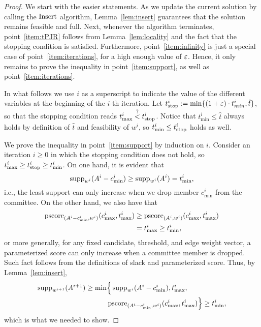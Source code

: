 \begin{proof}
We start with the easier statements. 
As we update the current solution by calling the $\operatorname{Insert}$ algorithm, Lemma~\ref{lem:insert} guarantees that the solution remains feasible and full. 
Next, whenever the algorithm terminates, point~\ref{item:tPJR} follows from Lemma~\ref{lem:locality} and the fact that the stopping condition is satisfied. 
Furthermore, point~\ref{item:infinity} is just a special case of point~\ref{item:iterations}, for a high enough value of $\varepsilon$. 
Hence, it only remains to prove the inequality in point~\ref{item:support}, as well as point~\ref{item:iterations}. 

In what follows we use $i$ as a superscript to indicate the value of the different variables at the beginning of the $i$-th iteration. 
 Let $t^i_{\operatorname*{stop}}:=\min\{(1+\varepsilon)\cdot t^i_{min}, \hat{t}\}$, so that the stopping condition reads $t^i_{\max} \stackrel{?}{<} t^i_{\operatorname*{stop}}$. 
Notice that $t^i_{\min}\leq \hat{t}$ always holds by definition of $\hat{t}$ and feasibility of $w^i$, so $t^i_{\min}\leq t^i_{\operatorname*{stop}}$ holds as well. 
 
We prove the inequality in point~\ref{item:support} by induction on $i$. 
Consider an iteration $i\geq 0$ in which the stopping condition does not hold, so $t^i_{\max} \geq t^i_{\operatorname*{stop}}\geq t^i_{\min}$. 
On one hand, it is evident that 
$$\operatorname{supp}_{w^i}(A^i-c^i_{\min})\geq \operatorname{supp}_{w^i}(A^i)=t^i_{\min}, $$ 
%
i.e., the least support can only increase when we drop member $c_{\min}^i$ from the committee. 
On the other hand, we also have that  
\begin{align*}
\operatorname{pscore}_{(A^i-c_{\min}^i, w^i)}(c^i_{\max}, t^i_{\max}) &\geq \operatorname{pscore}_{(A^i, w^i)}(c^i_{\max}, t^i_{\max}) \\
	& = t^i_{\max}\geq t^i_{\min},
\end{align*}
%
or more generally, for any fixed candidate, threshold, and edge weight vector, a parameterized score can only increase when a committee member is dropped. Such fact follows from the definitions of slack and parameterized score. 
Thus, by Lemma~\ref{lem:insert}, 
\begin{align*}
\operatorname{supp}_{w^{i+1}} (A^{i+1}) \geq \min & \Big\{ \operatorname{supp}_{w^i}(A^i-c^i_{\min}), t^i_{\max}, \\
	& \operatorname{pscore}_{(A^i-c_{\min}^i, w^i)}(c^i_{\max}, t^i_{\max})\Big\} \geq t^i_{\min}, 
\end{align*}
which is what we needed to show.


\end{proof}
